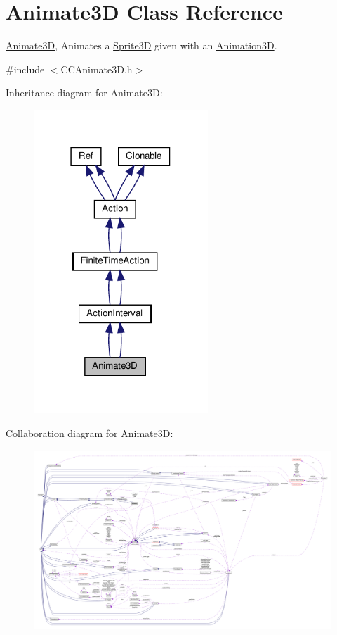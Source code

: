 \hypertarget{classAnimate3D}{}\section{Animate3D Class Reference}
\label{classAnimate3D}


\hyperlink{classAnimate3D}{Animate3D}, Animates a \hyperlink{classSprite3D}{Sprite3D} given with an \hyperlink{classAnimation3D}{Animation3D}.  




{\ttfamily \#include $<$C\+C\+Animate3\+D.\+h$>$}



Inheritance diagram for Animate3D\+:
\nopagebreak
\begin{figure}[H]
\begin{center}
\leavevmode
\includegraphics[width=186pt]{classAnimate3D__inherit__graph}
\end{center}
\end{figure}


Collaboration diagram for Animate3D\+:
\nopagebreak
\begin{figure}[H]
\begin{center}
\leavevmode
\includegraphics[width=350pt]{classAnimate3D__coll__graph}
\end{center}
\end{figure}
